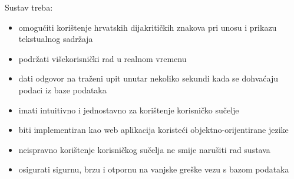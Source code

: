 		 	\noindent Sustav treba:
			 \begin{itemize}
			 	\item omogućiti korištenje hrvatskih dijakritičkih znakova pri unosu i prikazu tekstualnog sadržaja
			 	\item podržati višekorisnički rad u realnom vremenu
			 	\item dati odgovor na traženi upit unutar nekoliko sekundi kada se dohvaćaju podaci iz baze podataka
			 	\item imati intuitivno i jednostavno za korištenje korisničko sučelje
			 	\item biti implementiran kao web aplikacija koristeći objektno-orijentirane jezike
			 	\item neispravno korištenje korisničkog sučelja ne smije narušiti rad sustava
			 	\item osigurati sigurnu, brzu i otpornu na vanjske greške vezu s bazom podataka
			 \end{itemize}
			 
			 
			 
	